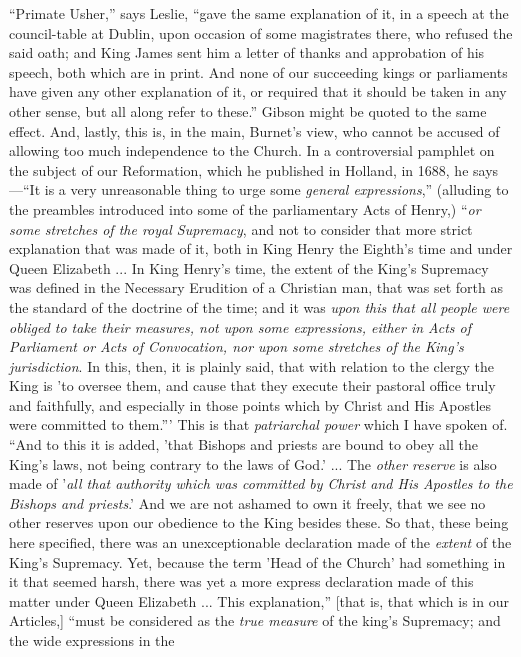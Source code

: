 ``Primate
Usher,'' says Leslie, ``gave the same explanation of it, in a speech at
the council-table at Dublin, upon occasion of some magistrates there,
who refused the said oath; and King James sent him a letter of thanks
and approbation of his speech, both which are in print. And none of
our succeeding kings or parliaments have given any other explanation
of it, or required that it should be taken in any other sense, but all
along refer to these.'' Gibson might be quoted to the same effect. And,
lastly, this is, in the main, Burnet's view, who cannot be accused of
allowing too much independence to the Church. In a controversial
pamphlet on the subject of our Reformation, which he published in
Holland, in 1688, he says—``It is a very unreasonable thing to urge
some \emph{general expressions},'' (alluding to the preambles
introduced into some of the parliamentary Acts of Henry,) ``\emph{or some
stretches of the royal Supremacy}, and not to consider that more
strict explanation that was made of it, both in King Henry the Eighth's
time and under Queen Elizabeth ... In King Henry's time, the extent of
the King's Supremacy was defined in the Necessary Erudition of a
Christian man, that was set forth as the standard of the doctrine of
the time; and it was \emph{upon this that all people were obliged to take
their measures, not upon some expressions, either in Acts of
Parliament or Acts of Convocation, nor upon some stretches of the King's
jurisdiction}. In this, then, it is plainly said, that with
relation to the clergy the King is 'to oversee them, and cause that
they execute their pastoral office truly and faithfully, and
especially in those points which by Christ and His Apostles were
committed to them.''' This is that \emph{patriarchal power} which I
have spoken of. ``And to this it is added, 'that Bishops and priests
are bound to obey all the King's laws, not being contrary to the laws
of God.' ... The \emph{other reserve} is also made of '\emph{all that
authority which was committed by Christ and His Apostles to the
Bishops and priests}.' And we are not ashamed to own it freely,
that we see no other reserves upon our obedience to the King besides
these. So that, these being here specified, there was an
unexceptionable declaration made of the \emph{extent} of the King's
Supremacy. Yet, because the term 'Head of the Church' had something in
it that seemed harsh, there was yet a more express declaration made of
this matter under Queen Elizabeth ... This explanation,'' [that is,
that which is in our Articles,] ``must be considered as the \emph{true
measure} of the king's Supremacy; and the wide expressions in the
